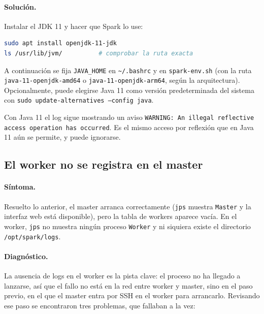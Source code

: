\documentclass[11pt,a4paper]{article}
\begin{document}
\paragraph{Solución.} Instalar el JDK 11 y hacer que Spark lo use:
\begin{lstlisting}[language=bash]
sudo apt install openjdk-11-jdk
ls /usr/lib/jvm/          # comprobar la ruta exacta
\end{lstlisting}
A continuación se fija \texttt{JAVA\_HOME} en \texttt{\textasciitilde/.bashrc} y en \texttt{spark-env.sh} (con la ruta \texttt{java-11-openjdk-amd64} o \texttt{java-11-openjdk-arm64}, según la arquitectura). Opcionalmente, puede elegirse Java 11 como versión predeterminada del sistema con \texttt{sudo update-alternatives --config java}.

Con Java 11 el log sigue mostrando un aviso \texttt{WARNING: An illegal reflective access operation has occurred}. Es el mismo acceso por reflexión que en Java 11 aún se permite, y puede ignorarse.

\subsection{El worker no se registra en el master}
\label{sec:problema-worker}

\paragraph{Síntoma.} Resuelto lo anterior, el master arranca correctamente (\texttt{jps} muestra \texttt{Master} y la interfaz web está disponible), pero la tabla de workers aparece vacía. En el worker, \texttt{jps} no muestra ningún proceso \texttt{Worker} y ni siquiera existe el directorio \texttt{/opt/spark/logs}.

\paragraph{Diagnóstico.} La ausencia de logs en el worker es la pista clave: el proceso no ha llegado a lanzarse, así que el fallo no está en la red entre worker y master, sino en el paso previo, en el que el master entra por SSH en el worker para arrancarlo. Revisando ese paso se encontraron tres problemas, que fallaban a la vez:
\end{document}
